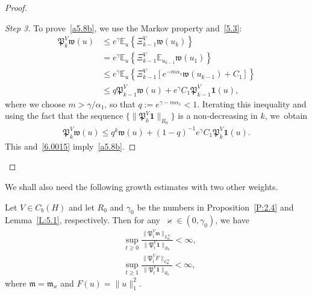 \documentclass[AHL,Unicode,longabstracts]{cedram}
\newcommand{\mek}{{\mathbf 1}}
\newcommand{\we}{\mathfrak{w}}
\newcommand{\E}{{\mathbb E}}
\newcommand{\vk}{{\varkappa}}
\newcommand{\wwww}{{\mathfrak w}}
\newcommand{\mm}{{\mathfrak m}}
\newcommand{\PPPP}{{\mathfrak P}}
\begin{document}
\begin{proof}
\begin{proof}[Step 3]
To prove~\eqref{a5.8b}, we use the Markov property and~\eqref{5.3}:
\begin{align*}
\PPPP_{k}^V\wwww(u) &\le e^{\gamma} \E_u \left\{\Xi^V_{k-1} \wwww(u_{k}) \right\}\\&= e^{\gamma} \E_u \left\{\Xi^V_{k-1} \E_{u_{k-1}} \wwww(u_1) \right\} \\&\le e^{\gamma} \E_u \left\{\Xi^V_{k-1} [e^{-m\alpha_1 }\we(u_{k-1})+C_1] \right\} \\&\le q \PPPP_{k-1}^V\wwww(u)+ e^{\gamma} C_1 \PPPP_{k-1}^V{\mek}(u),
\end{align*}
where we choose $m > \gamma/\alpha_1 $, so that $q:=e^{\gamma-m\alpha_1}<1$. Iterating this inequality and using the fact that the sequence $\{\|\PPPP_{k}^V{\mek}\|_{R_0}\}$ is a non-decreasing in $k$, we~obtain
\begin{align*}
\PPPP_{k}^V\wwww(u) \le q^k \wwww(u)+ (1-q)^{-1}e^{\gamma} C_1 \PPPP_{k}^V{\mek}(u).
\end{align*}
This and~\eqref{6.0015} imply~\eqref{a5.8b}.
\end{proof}
\let\qed\relax
\end{proof}

We shall also need the following growth estimates with two other weights.

\begin{prop}\label{C:2.5}
Let $V\in C_b(H)$ and let $R_0$ and $\gamma_0$ be the numbers in Proposition~\ref{P:2.4} and Lemma~\ref{L:5.1}, respectively. Then for any~$\vk\in(0,\gamma_0)$, we have
\begin{align}
&\sup_{t\ge0} \frac{\|\PPPP_t^V\mm\|_{L_\mm^\infty}}{\|\PPPP_t^V{\mek}\|_{R_0}}<\infty, \label{dqdlkk}
\\
&\sup_{t\ge1} \frac{\|\PPPP_t^V F \|_{L_{\mm}^\infty}}{\|\PPPP_t^V{\mek}\|_{R_0}}<\infty, \label{estimE}
\end{align}
where $\mm=\mm_\vk$ and $F(u)= \|u\|_1^2$.
\end{prop}
\end{document}
